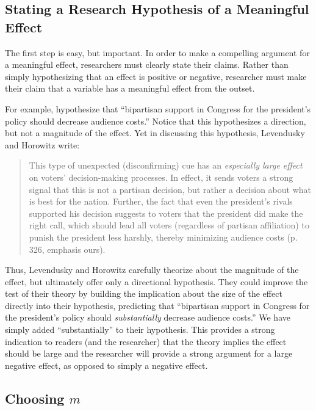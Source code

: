 \documentclass[12pt]{article}
\begin{document}
\subsection*{Stating a Research Hypothesis of a Meaningful Effect}

The first step is easy, but important. In order to make a compelling argument for a meaningful effect, researchers must clearly state their claims. Rather than simply hypothesizing that an effect is positive or negative, researcher must make their claim that a variable has a meaningful effect from the outset. 

For example, \cite{LevenduskyHorowitz2012} hypothesize that ``bipartisan support in Congress for the president's policy should decrease audience costs.'' Notice that this hypothesizes a direction, but not a magnitude of the effect. Yet in discussing this hypothesis, Levendusky and Horowitz write: 

\begin{quote}
This type of unexpected (disconfirming) cue has an \emph{especially large effect} on voters' decision-making processes. In effect, it sends voters a strong signal that this is not a partisan decision, but rather a decision about what is best for the nation. Further, the fact that even the president's rivals supported his decision suggests to voters that the president did make the right call, which should lead all voters (regardless of partisan affiliation) to punish the president less harshly, thereby minimizing audience costs (p. 326, emphasis ours).
\end{quote}

\noindent Thus, Levendusky and Horowitz carefully theorize about the magnitude of the effect, but ultimately offer only a directional hypothesis. They could improve the test of their theory by building the implication about the size of the effect directly into their hypothesis, predicting that ``bipartisan support in Congress for the president's policy should \emph{substantially} decrease audience costs.'' We have simply added ``substantially'' to their hypothesis. This provides a strong indication to readers (and the researcher) that the theory implies the effect should be large and the researcher will provide a strong argument for a large negative effect, as opposed to simply a negative effect. 

\subsection*{Choosing $m$}
\end{document}
